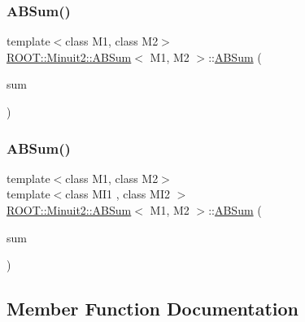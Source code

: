 \subsubsection{\texorpdfstring{ABSum()}{ABSum()}\hspace{0.1cm}{\footnotesize\ttfamily [5/6]}}
{\footnotesize\ttfamily template$<$class M1, class M2$>$ \\
\mbox{\hyperlink{classROOT_1_1Minuit2_1_1ABSum}{R\+O\+O\+T\+::\+Minuit2\+::\+A\+B\+Sum}}$<$ M1, M2 $>$\+::\mbox{\hyperlink{classROOT_1_1Minuit2_1_1ABSum}{A\+B\+Sum}} (\begin{DoxyParamCaption}\item[{const \mbox{\hyperlink{classROOT_1_1Minuit2_1_1ABSum}{A\+B\+Sum}}$<$ M1, M2 $>$ \&}]{sum }\end{DoxyParamCaption})\hspace{0.3cm}{\ttfamily [inline]}}

\mbox{\label{classROOT_1_1Minuit2_1_1ABSum_a4f9776ad68bfb91ccf613b367ecf6730}} 
\subsubsection{\texorpdfstring{ABSum()}{ABSum()}\hspace{0.1cm}{\footnotesize\ttfamily [6/6]}}
{\footnotesize\ttfamily template$<$class M1, class M2$>$ \\
template$<$class M\+I1 , class M\+I2 $>$ \\
\mbox{\hyperlink{classROOT_1_1Minuit2_1_1ABSum}{R\+O\+O\+T\+::\+Minuit2\+::\+A\+B\+Sum}}$<$ M1, M2 $>$\+::\mbox{\hyperlink{classROOT_1_1Minuit2_1_1ABSum}{A\+B\+Sum}} (\begin{DoxyParamCaption}\item[{const \mbox{\hyperlink{classROOT_1_1Minuit2_1_1ABSum}{A\+B\+Sum}}$<$ M\+I1, M\+I2 $>$ \&}]{sum }\end{DoxyParamCaption})\hspace{0.3cm}{\ttfamily [inline]}}



\subsection{Member Function Documentation}
\mbox{\label{classROOT_1_1Minuit2_1_1ABSum_a079b47b55709bd81d820c277aa389b4f}} 
